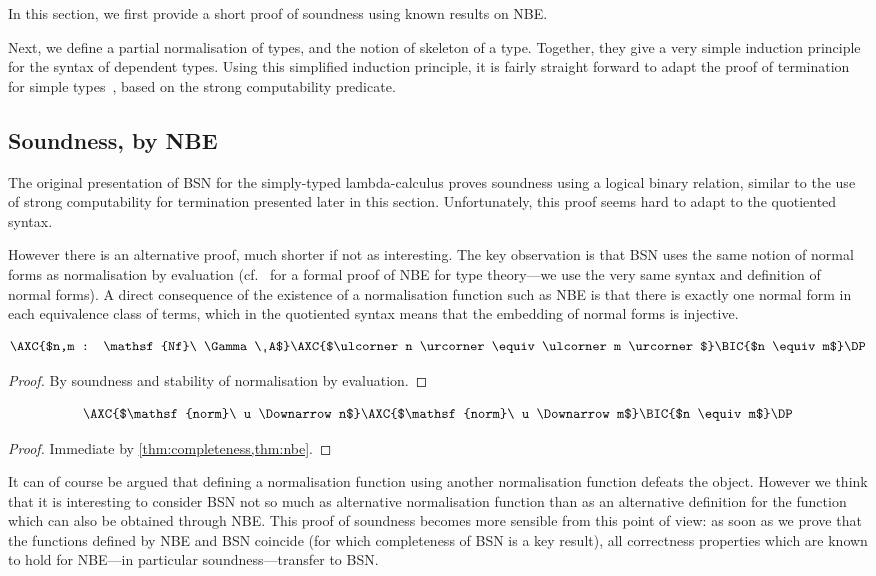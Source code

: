 \documentclass[a4paper,UKenglish,cleveref]{lipics-v2019}
\newcommand{\agdaSymb}[1]{\mathsf{#1}}
\newcommand{\Nf}{\agdaSymb{Nf}}
\newcommand{\norm}{\agdaSymb{norm}}
\newcommand{\cul}{\ulcorner}
\newcommand{\cur}{\urcorner}
\newcommand{\Da}{\Downarrow}
\begin{document}
In this section, we first provide a short proof of soundness using known results
on NBE.

Next, we define a partial normalisation of types, and the notion of skeleton of
a type. Together, they give a very simple induction principle for the syntax of
dependent types. Using this simplified induction principle, it is fairly straight
forward to adapt the proof of termination for simple types~\cite{chapman2009bsn},
based on the strong computability predicate.

\subsection{Soundness, by NBE}
The original presentation of BSN for the simply-typed lambda-calculus proves
soundness using a logical binary relation, similar to the use of strong
computability for termination presented later in this section. Unfortunately,
this proof seems hard to adapt to the quotiented syntax.

However there is an alternative proof, much shorter if not as interesting.
The key observation is that BSN uses the same notion of normal forms as
normalisation by evaluation (cf.~\cite{kaposi2016normalisation} for a formal
proof of NBE for type theory---we use the very same syntax and definition of
normal forms). A direct consequence of the existence of a normalisation function
such as NBE is that there is exactly one normal form in each equivalence class
of terms, which in the quotiented syntax means that the embedding of normal
forms is injective.
\begin{theorem}
  \label{thm:nbe}
  \[ \AXC{$n,m : \Nf\ \Gamma\ A$}\AXC{$\cul n \cur \equiv \cul m \cur$}\BIC{$n \equiv m$}\DP \]
\end{theorem}
\begin{proof}
  By soundness and stability of normalisation by evaluation.
\end{proof}

\begin{theorem}[Soundness]
  \label{thm:soundness}
  \[ \AXC{$\norm\ u \Da n$}\AXC{$\norm\ u \Da m$}\BIC{$n \equiv m$}\DP \]
\end{theorem}
\begin{proof}
  Immediate by \cref{thm:completeness,thm:nbe}.
\end{proof}

It can of course be argued that defining a normalisation function using another
normalisation function defeats the object. However we think that it is interesting
to consider BSN not so much as alternative normalisation function than as an
alternative definition for the function which can also be obtained through NBE.
This proof of soundness becomes more sensible from this point of view: as soon
as we prove that the functions defined by NBE and BSN coincide (for which
completeness of BSN is a key result), all correctness properties which are known
to hold for NBE---in particular soundness---transfer to BSN.
\end{document}
